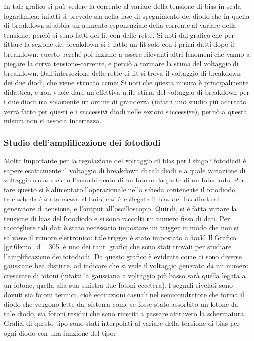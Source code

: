 In tale grafico si può vedere la corrente al variare della tensione di bias in scala logaritmica: infatti si prevede sia nella fase di spegnimento del diodo che in quella di breakdown si abbia un aumento esponenziale della corrente al variare della tensione; perciò si sono fatti dei fit con delle rette. Si noti dal grafico che per fittare la sezione del breakdown si è fatto un fit solo con i primi datti dopo il breakdown: questo perché poi inziano a essere rilevanti altri fenomeni che vanno a piegare la curva tensione-corrente, e perciò a rovinare la stima del voltaggio di breakdown.
Dall'intersezione delle rette di fit si trova il voltaggio di breakdown dei due diodi, che viene stimato come:
Si noti che questa misura è principalmente didattica, e non vuole dare un'effettiva utile stima del voltaggio di breakdown per i due diodi ma solamente un'ordine di grandezza
(infatti uno studio più accurato verrà fatto per questi e i successivi diodi nelle sezioni successive), perciò a questa misura non si associa incertezza.

\subsubsection{Studio dell'amplificazione dei fotodiodi}
Molto importante per la regolazione del voltaggio di bias per i singoli fotodiodi è sapere esattamente il voltaggio di breakdown di tali diodi e a quale variazione di
voltaggio sia associato l'assorbimento di un fotone da parte di un fotodiodo. Per fare questo si è alimentato l'operazionale nella scheda contenente il fotodiodo, tale
scheda è stata messa al buio, e si è collegato il bias del fotodiodo al generatore di tensione, e l'output all'oscilloscopio. Quindi, si è fatta variare la tensione
di bias del fotodiodo e si sono raccolti un numero fisso di dati. Per raccogliere tali dati è stato necessario impostare un trigger in modo che non si salvasse il rumore elettronico: tale trigger è stato impostato a $5 mV$.
Il Grafico \ref{gr:6lemo_d1_305} è uno dei tanti grafici che sono stati
trovati per studiare l'amplificazione dei fotodiodi. Da questo grafico è evidente come ci sono diverse gaussiane ben distinte, ad indicare che si vede il voltaggio
generato da un numero crescente di fotoni (infatti la gaussiana a voltaggio più basso sarà quella legata a un fotone, quella alla sua sinistra due fotoni eccetera).
I segnali rivelati sono dovuti sia fotoni termici, cioè eccitazioni casuali nel semiconduttore che forma il diodo che vengono lette dal sistema come se fosse stato assorbito un fotone
da tale diodo, sia fotoni residui che sono riusciti a passare attravero la schermatura. Grafici di questo tipo sono stati interpolati al variare della tensione di bias per ogni diodo con una funzione del tipo:

